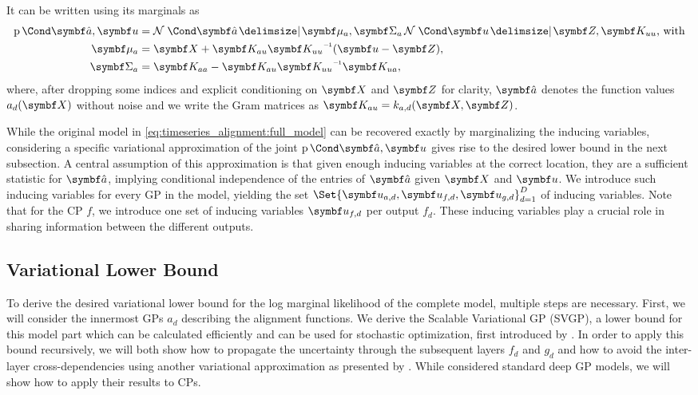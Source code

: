 It can be written using its marginals \parencite{titsias_variational_2009} as
\begin{align}
    \label{eq:timeseries_alignment:augmented_joint}
    \begin{split}
        \Prob{\rv{\hat{a}}, \rv{u}} &= \Gaussian{\rv{\hat{a}} \given \mat{\mu_a}, \mat{\Sigma_a}}\Gaussian{\rv{u} \given \rv{Z}, \mat{K_{uu}}}\text{, with} \\
        \mat{\mu_a} &= \mat{X} + \mat{K_{au}}\mat{K_{uu}}\inv(\rv{u} - \mat{Z}), \\
        \mat{\Sigma_a} &= \mat{K_{aa}} - \mat{K_{au}}\mat{K_{uu}}\inv\mat{K_{ua}},
    \end{split}
\end{align}
where, after dropping some indices and explicit conditioning on $\mat{X}$ and $\mat{Z}$ for clarity, $\rv{\hat{a}}$ denotes the function values $a_d(\mat{X})$ without noise and we write the Gram matrices as $\mat{K_{au}} = k_{a, d}(\mat{X}, \mat{Z})$.

While the original model in \cref{eq:timeseries_alignment:full_model} can be recovered exactly by marginalizing the inducing variables, considering a specific variational approximation of the joint $\Prob{\rv{\hat{a}}, \rv{u}}$ gives rise to the desired lower bound in the next subsection.
A central assumption of this approximation \parencite{titsias_variational_2009} is that given enough inducing variables at the correct location, they are a sufficient statistic for $\rv{\hat{a}}$, implying conditional independence of the entries of $\rv{\hat{a}}$ given $\mat{X}$ and $\rv{u}$.
We introduce such inducing variables for every GP in the model, yielding the set $\Set{\rv{u_{a, d}}, \rv{u_{f, d}}, \rv{u_{g, d}}}_{d=1}^D$ of inducing variables.
Note that for the CP $f$, we introduce one set of inducing variables $\rv{u_{f, d}}$ per output $f_d$.
These inducing variables play a crucial role in sharing information between the different outputs.


\subsection{Variational Lower Bound}
\label{sub:timeseries_alignment:lower_bound}
To derive the desired variational lower bound for the log marginal likelihood of the complete model, multiple steps are necessary.
First, we will consider the innermost GPs $a_d$ describing the alignment functions.
We derive the Scalable Variational GP (SVGP), a lower bound for this model part which can be calculated efficiently and can be used for stochastic optimization, first introduced by \textcite{hensman_gaussian_2013}.
In order to apply this bound recursively, we will both show how to propagate the uncertainty through the subsequent layers $f_d$ and $g_d$ and how to avoid the inter-layer cross-dependencies using another variational approximation as presented by \textcite{hensman_nested_2014}.
While \citeauthor{hensman_nested_2014} considered standard deep GP models, we will show how to apply their results to CPs.

